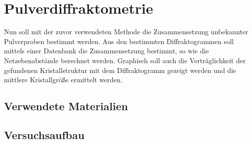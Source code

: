 \section{Pulverdiffraktometrie}
Nun soll mit der zuvor verwendeten Methode die Zusammensetzung unbekannter Pulverproben bestimmt werden. Aus den bestimmten Diffraktogrammen soll mittels einer Datenbank die Zusammensetzung bestimmt, so wie die Netzebenabst\"ande berechnet werden. Graphisch soll auch die Vertr\"aglichkeit der gefundenen Kristallstruktur mit dem Diffraktogramm gezeigt werden und die mittlere Kristallgr\"o\ss e ermittelt werden.
\subsection{Verwendete Materialien}
\subsection{Versuchsaufbau}

